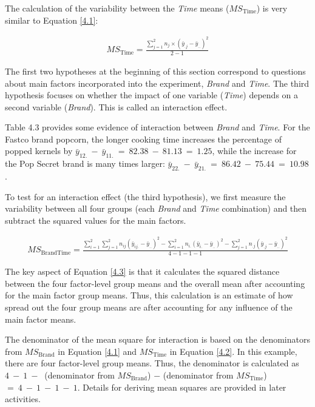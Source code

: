 \documentclass[
]{report}
\begin{document}
The calculation of the variability between the \emph{Time} means (\(\scriptstyle MS_{\text{Time}}\)) is very similar to Equation \ref{4.1}:

\begin{align}\label{4.2}
MS_{\text{Time}} = \frac{\sum_{j=1}^{2} n_j \times (\bar{y}_{.j} - \bar{y}_{..})^2}{2-1}
\tag{4.2}
\end{align}

The first two hypotheses at the beginning of this section correspond to questions about main factors incorporated into the experiment, \emph{Brand} and \emph{Time}. The third hypothesis focuses on whether the impact of one variable (\emph{Time}) depends on a second variable (\emph{Brand}). This is called an interaction effect.

Table 4.3 provides some evidence of interaction between \emph{Brand} and \emph{Time}. For the Fastco brand popcorn, the longer cooking time increases the percentage of popped kernels by \(\scriptstyle \bar{y}_{12.} \ -\  \bar{y}_{11.} \ =\  82.38 \ -\  81.13 \ =\  1.25\), while the increase for the Pop Secret brand is many times larger: \(\scriptstyle \bar{y}_{22.} \ -\  \bar{y}_{21.} \ =\  86.42 \ -\  75.44 \ =\  10.98\).

To test for an interaction effect (the third hypothesis), we first measure the variability between all four groups (each \emph{Brand} and \emph{Time} combination) and then subtract the squared values for the main factors.

\begin{align}\label{4.3}
MS_{\text{BrandTime}} = \frac{\sum_{i=1}^{2}\sum_{j=1}^{2} n_{ij}(\bar{y}_{ij.} - \bar{y}_{..})^2 - \sum_{i=1}^{2} n_{i.}(\bar{y}_{i.} - \bar{y}_{..})^2 - \sum_{j=1}^{2} n_{.j}(\bar{y}_{.j} - \bar{y}_{..})^2}{4 - 1 - 1 - 1}
\tag{4.3}
\end{align}

The key aspect of Equation \ref{4.3} is that it calculates the squared distance between the four factor-level group means and the overall mean after accounting for the main factor group means. Thus, this calculation is an estimate of how spread out the four group means are after accounting for any influence of the main factor means.

The denominator of the mean square for interaction is based on the denominators from \(\scriptstyle MS_{\text{Brand}}\) in Equation \ref{4.1} and \(\scriptstyle MS_{\text{Time}}\) in Equation \ref{4.2}. In this example, there are four factor-level group means. Thus, the denominator is calculated as \(\scriptstyle 4 \ -\  1 \ -\ \) (denominator from \(\scriptstyle MS_{\text{Brand}}\)) \(\scriptstyle -\) (denominator from \(\scriptstyle MS_{\text{Time}}\)) \(\scriptstyle =\  4\  -\  1 \ -\  1 \ -\  1\). Details for deriving mean squares are provided in later activities.
\end{document}
